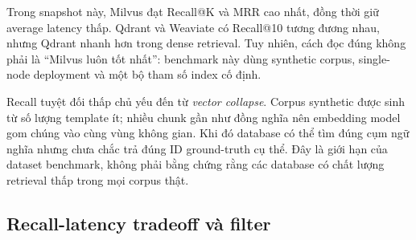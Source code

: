 \begin{table}[H]
\centering
\caption{Recall@K, MRR và latency trung bình (corpus = 10K, queries = 200).}
\label{tab:accuracy}
\end{table}

Trong snapshot này, Milvus đạt Recall@K và MRR cao nhất, đồng thời giữ average latency thấp. Qdrant và Weaviate có Recall@10 tương đương nhau, nhưng Qdrant nhanh hơn trong dense retrieval. Tuy nhiên, cách đọc đúng không phải là ``Milvus luôn tốt nhất'': benchmark này dùng synthetic corpus, single-node deployment và một bộ tham số index cố định.

Recall tuyệt đối thấp chủ yếu đến từ \textit{vector collapse}. Corpus synthetic được sinh từ số lượng template ít; nhiều chunk gần như đồng nghĩa nên embedding model gom chúng vào cùng vùng không gian. Khi đó database có thể tìm đúng cụm ngữ nghĩa nhưng chưa chắc trả đúng ID ground-truth cụ thể. Đây là giới hạn của dataset benchmark, không phải bằng chứng rằng các database có chất lượng retrieval thấp trong mọi corpus thật.

\subsection{Recall-latency tradeoff và filter}

\begin{table}[H]
\centering
\caption{Tradeoff sweep: Recall (\%) / Avg latency (ms) theo top\_k.}
\label{tab:tradeoff}
\end{table}

